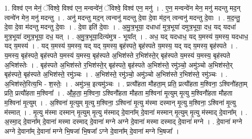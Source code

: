 \documentclass[17pt]{extarticle}
\begin{document}
1. विश्व॑ एन मेनं॒ ॅविश्वे॒ विश्व॑ एन॒ मन्वन्वे॑नं॒ ॅविश्वे॒ विश्व॑ एन॒ मनु॑ । . ए॒न॒ मन्वन्वे॑न मेन॒ मनु॑ मदन्तु मद॒न् त्वन्वे॑न मेन॒ मनु॑ मदन्तु । . अनु॑ मदन्तु मद॒न् त्वन्वनु॑ मदन्तु दे॒वा दे॒वा म॑द॒न् त्वन्वनु॑ मदन्तु दे॒वाः । . म॒द॒न्तु॒ दे॒वा दे॒वा म॑दन्तु मदन्तु दे॒वाः । . दे॒वा इति॑ दे॒वाः । . अ॒मु॒त्र॒भूया॒ दधाधा॑ मुत्र॒भूया॑ दमुत्र॒भूया॒ दध॒ यद् यदधा॑ मुत्र॒भूया॑ दमुत्र॒भूया॒ दध॒ यत् । . अ॒मु॒त्र॒भूया॒दित्य॑मुत्र - भूया᳚त् । . अध॒ यद् यदधाध॒ यद् य॒मस्य॑ य॒मस्य॒ यदधाध॒ यद् य॒मस्य॑ । . यद् य॒मस्य॑ य॒मस्य॒ यद् यद् य॒मस्य॒ बृह॑स्पते॒ बृह॑स्पते य॒मस्य॒ यद् यद् य॒मस्य॒ बृह॑स्पते । . य॒मस्य॒ बृह॑स्पते॒ बृह॑स्पते य॒मस्य॑ य॒मस्य॒ बृह॑स्पते अ॒भिश॑स्ते र॒भिश॑स्ते॒र् बृह॑स्पते य॒मस्य॑ य॒मस्य॒ बृह॑स्पते अ॒भिश॑स्तेः । . बृह॑स्पते अ॒भिश॑स्ते र॒भिश॑स्ते॒र् बृह॑स्पते॒ बृह॑स्पते अ॒भिश॑स्ते॒ रमु॑ञ्चो॒ अमु॑ञ्चो अ॒भिश॑स्ते॒र् बृह॑स्पते॒ बृह॑स्पते अ॒भिश॑स्ते॒ रमु॑ञ्चः । . अ॒भिश॑स्ते॒ रमु॑ञ्चो॒ अमु॑ञ्चो अ॒भिश॑स्ते र॒भिश॑स्ते॒ रमु॑ञ्चः । . अ॒भिश॑स्ते॒रित्य॒भि - श॒स्तेः॒ । . अमु॑ञ्च॒ इत्यमु॑ञ्चः । . प्रत्यौ॑हता मौहता॒म् प्रति॒ प्रत्यौ॑हता म॒श्विना॒ ऽश्विनौ॑हता॒म् प्रति॒ प्रत्यौ॑हता म॒श्विना᳚ । . औ॒ह॒ता॒ म॒श्विना॒ ऽश्विनौ॑हता मौहता म॒श्विना॑ मृ॒त्युम् मृ॒त्यु म॒श्विनौ॑हता मौहता म॒श्विना॑ मृ॒त्युम् । . अ॒श्विना॑ मृ॒त्युम् मृ॒त्यु म॒श्विना॒ ऽश्विना॑ मृ॒त्यु म॑स्मा दस्मान् मृ॒त्यु म॒श्विना॒ ऽश्विना॑ मृ॒त्यु म॑स्मात् । . मृ॒त्यु म॑स्मा दस्मान् मृ॒त्युम् मृ॒त्यु म॑स्माद् दे॒वाना᳚म् दे॒वाना॑ मस्मान् मृ॒त्युम् मृ॒त्यु म॑स्माद् दे॒वाना᳚म् । . अ॒स्मा॒द् दे॒वाना᳚म् दे॒वाना॑ मस्मा दस्माद् दे॒वाना॑ मग्ने अग्ने दे॒वाना॑ मस्मा दस्माद् दे॒वाना॑ मग्ने । . दे॒वाना॑ मग्ने अग्ने दे॒वाना᳚म् दे॒वाना॑ मग्ने भि॒षजा॑ भि॒षजा᳚ ऽग्ने दे॒वाना᳚म् दे॒वाना॑ मग्ने भि॒षजा᳚ । \newline
\end{document}
